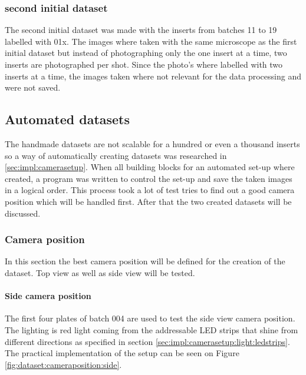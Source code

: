 	
		\subsubsection{second initial dataset}

			The second initial dataset was made with the inserts from batches 11 to 19 labelled with 01x. The images where taken with the same microscope as the first initial dataset but instead of photographing only the one insert at a time, two inserts are photographed per shot.
Since the photo's where labelled with two inserts at a time, the images taken where not relevant for the data processing and were not saved.

	\subsection{Automated datasets}

	The handmade datasets are not scalable for a hundred or even a thousand inserts so a way of automatically creating datasets was researched in \ref{sec:impl:camerasetup}. When all building blocks for an automated set-up where created, a program was written to control the set-up  and save the taken images in a logical order. This process took a lot of test tries to find out a good camera position which will be handled first. After that the two created datasets will be discussed.

		\subsubsection{Camera position}
		In this section the best camera position will be defined  for the creation of the dataset. Top view as well as side view will be tested.

		\paragraph{Side camera position}

		The first four plates of batch 004 are used to test the side view camera position. The lighting is red light coming from the addressable LED strips that shine from different directions as specified in section \ref{sec:impl:camerasetup:light:ledstrips}. The practical implementation of the setup can be seen on Figure \ref{fig:dataset:cameraposition:side}.

